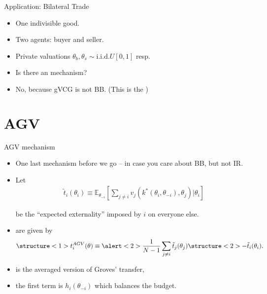 \documentclass[english,10pt
,aspectratio=169
,handout
]{beamer}
\begin{document}
\begin{frame}{Application: Bilateral Trade}
	\begin{example}
		\begin{itemize}
			\item One indivisible good.
			\item Two agents: buyer and seller. 
			\item Private valuations $\theta_b,\theta_s \sim \text{i.i.d.} U[0,1]$ resp.
			\item Is there an 
			 mechanism?
		\end{itemize}
	\end{example}
	\begin{itemize}
		\item No, because gVCG is not BB. 
		(This is the )
	\end{itemize}
\end{frame}




\section{AGV}

\begin{frame}{AGV mechanism}
\begin{itemize}
	\item One last mechanism before we go -- in case you care about BB, but not IR.
	\item Let 
	\vspace{-0.5em}\begin{align*}
		\tilde{t}_i (\theta_i) \equiv \mathbb{E}_{\theta_{-i}} \left[ \sum_{j \neq i} v_j (k^*(\theta_i,\theta_{-i}), \theta_j) | \theta_i \right]
	\end{align*}
	
	be the ``expected externality'' imposed by $i$ on everyone else.
	\item {} are given by
	\vspace{-0.5em}\begin{align*}
		\structure<1>{t_i^{AGV} (\theta) \equiv \alert<2>{\frac{1}{N-1} \sum_{j \neq i} \tilde{t}_j (\theta_j)} \structure<2>{- \tilde{t}_i (\theta_i)}}.
	\end{align*}\vspace{-1em}
	\pause
	\item {} is the averaged version of Groves' transfer,
	\item \alert{the first term} is $h_i(\theta_{-i})$ which balances the budget.
\end{itemize}
\end{frame}
\end{document}
